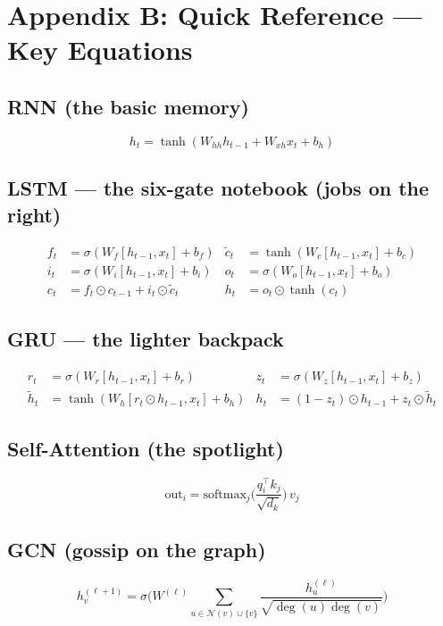 \documentclass[11pt,a4paper]{article}
\begin{document}
\section*{Appendix B: Quick Reference --- Key Equations}

\subsection*{RNN (the basic memory)}
\begin{equation*}
h_t = \tanh(W_{hh} h_{t-1} + W_{xh} x_t + b_h)
\end{equation*}

\subsection*{LSTM --- the six-gate notebook (jobs on the right)}
\begin{align*}
f_t &= \sigma(W_f [h_{t-1},x_t] + b_f) & \tilde{c}_t &= \tanh(W_c [h_{t-1},x_t] + b_c)\\
i_t &= \sigma(W_i [h_{t-1},x_t] + b_i) & o_t &= \sigma(W_o [h_{t-1},x_t] + b_o)\\
c_t &= f_t \odot c_{t-1} + i_t \odot \tilde{c}_t & h_t &= o_t \odot \tanh(c_t)
\end{align*}

\subsection*{GRU --- the lighter backpack}
\begin{align*}
r_t &= \sigma(W_r [h_{t-1},x_t] + b_r) & z_t &= \sigma(W_z [h_{t-1},x_t] + b_z)\\
\tilde{h}_t &= \tanh(W_h [r_t \odot h_{t-1}, x_t] + b_h) & h_t &= (1-z_t) \odot h_{t-1} + z_t \odot \tilde{h}_t
\end{align*}

\subsection*{Self-Attention (the spotlight)}
\begin{equation*}
\text{out}_i = \text{softmax}_j\!\Big(\frac{q_i^\top k_j}{\sqrt{d_k}}\Big)\, v_j
\end{equation*}

\subsection*{GCN (gossip on the graph)}
\begin{equation*}
h_v^{(\ell+1)} = \sigma\Big( W^{(\ell)}
\textstyle\sum_{u \in \mathcal{N}(v)\cup\{v\}}
\frac{h_u^{(\ell)}}{\sqrt{\deg(u)\deg(v)}} \Big)
\end{equation*}
\end{document}
